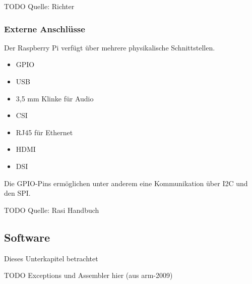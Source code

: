 TODO Quelle: Richter

\subsubsection{Externe Anschlüsse}
Der Raspberry Pi verfügt über mehrere physikalische Schnittstellen. 
\begin{itemize}
\item \ac{GPIO}
\item USB
\item 3,5 mm Klinke für Audio
\item \ac{CSI}
\item RJ45 für Ethernet
\item HDMI
\item \ac{DSI}
\end{itemize}

Die \ac{GPIO}-Pins ermöglichen unter anderem eine Kommunikation über \ac{I2C} und den \ac{SPI}. 

TODO Quelle: Rasi Handbuch
 
\subsection{Software}
Dieses Unterkapitel betrachtet 
 
TODO Exceptions und Assembler hier (aus arm-2009)





          
 
